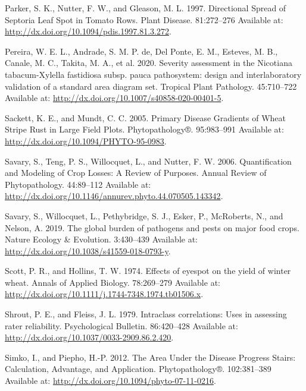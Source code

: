 \documentclass[
  letterpaper,
  DIV=11,
  numbers=noendperiod]{scrreprt}
\newlength{\cslhangindent}
\newlength{\cslentryspacingunit} %
\newenvironment{CSLReferences}[2] %
 {%
  \setlength{\parindent}{0pt}
  \ifodd #1
  \let\oldpar\par
  \def\par{\hangindent=\cslhangindent\oldpar}
  \fi
  \setlength{\parskip}{#2\cslentryspacingunit}
 }%
 {}
\begin{document}
\begin{CSLReferences}{0}{0}
\leavevmode{}%
Parker, S. K., Nutter, F. W., and Gleason, M. L. 1997. Directional
Spread of Septoria Leaf Spot in Tomato Rows. Plant Disease. 81:272--276
Available at: \url{http://dx.doi.org/10.1094/pdis.1997.81.3.272}.

\leavevmode{}%
Pereira, W. E. L., Andrade, S. M. P. de, Del Ponte, E. M., Esteves, M.
B., Canale, M. C., Takita, M. A., et al. 2020. Severity assessment in
the Nicotiana tabacum-Xylella fastidiosa subsp. pauca pathosystem:
design and interlaboratory validation of a standard area diagram set.
Tropical Plant Pathology. 45:710--722 Available at:
\url{http://dx.doi.org/10.1007/s40858-020-00401-5}.

\leavevmode{}%
Sackett, K. E., and Mundt, C. C. 2005. Primary Disease Gradients of
Wheat Stripe Rust in Large Field Plots. Phytopathology®. 95:983--991
Available at: \url{http://dx.doi.org/10.1094/PHYTO-95-0983}.

\leavevmode{}%
Savary, S., Teng, P. S., Willocquet, L., and Nutter, F. W. 2006.
Quantification and Modeling of Crop Losses: A Review of Purposes. Annual
Review of Phytopathology. 44:89--112 Available at:
\url{http://dx.doi.org/10.1146/annurev.phyto.44.070505.143342}.

\leavevmode{}%
Savary, S., Willocquet, L., Pethybridge, S. J., Esker, P., McRoberts,
N., and Nelson, A. 2019. The global burden of pathogens and pests on
major food crops. Nature Ecology \& Evolution. 3:430--439 Available at:
\url{http://dx.doi.org/10.1038/s41559-018-0793-y}.

\leavevmode{}%
Scott, P. R., and Hollins, T. W. 1974. Effects of eyespot on the yield
of winter wheat. Annals of Applied Biology. 78:269--279 Available at:
\url{http://dx.doi.org/10.1111/j.1744-7348.1974.tb01506.x}.

\leavevmode{}%
Shrout, P. E., and Fleiss, J. L. 1979. Intraclass correlations: Uses in
assessing rater reliability. Psychological Bulletin. 86:420--428
Available at: \url{http://dx.doi.org/10.1037/0033-2909.86.2.420}.

\leavevmode{}%
Simko, I., and Piepho, H.-P. 2012. The Area Under the Disease Progress
Stairs: Calculation, Advantage, and Application. Phytopathology®.
102:381--389 Available at:
\url{http://dx.doi.org/10.1094/phyto-07-11-0216}.


\end{CSLReferences}
\end{document}
